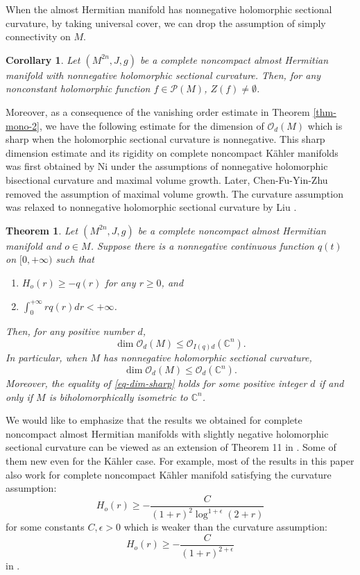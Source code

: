 \documentclass[12pt]{amsart}
\def\e{\epsilon}
\newcommand\C{{\mathbb C}}
\newtheorem{thm}{Theorem}[section]
\newtheorem{cor}{Corollary}[section]
\theoremstyle{definition}
\theoremstyle{remark}
\numberwithin{equation}{section}
\def\D{\displaystyle}
\begin{document}
When the almost Hermitian manifold has nonnegative holomorphic sectional curvature, by taking universal cover, we can drop the assumption of simply connectivity on $M$.
\begin{cor}\label{cor-fund-holo}
Let $(M^{2n},J,g)$ be a complete noncompact almost Hermitian manifold with nonnegative holomorphic sectional curvature. Then, for any nonconstant holomorphic function $f\in \mathcal P(M)$, $Z(f)\neq\emptyset$.
\end{cor}
Moreover,  as a consequence of the vanishing order estimate in  Theorem \ref{thm-mono-2}, we have the following estimate for the dimension of $\mathcal O_d(M)$ which is sharp when the holomorphic sectional curvature is nonnegative. This sharp dimension estimate and its rigidity on complete noncompact K\"ahler manifolds was first obtained by Ni \cite{Ni} under the assumptions of nonnegative holomorphic bisectional curvature and maximal volume growth. Later, Chen-Fu-Yin-Zhu \cite{CFYZ} removed the assumption of maximal volume growth. The curvature assumption was relaxed to nonnegative holomorphic sectional curvature by Liu \cite{Liu}.
\begin{thm}\label{thm-dim}
Let $(M^{2n},J,g)$ be a complete noncompact almost Hermitian manifold and $o\in M$. Suppose there is a nonnegative continuous function $q(t)$ on $[0,+\infty)$ such that  \begin{enumerate}
\item $H_o(r)\geq -q(r)$ for any $r\geq0$, and
\item $\D\int_0^{+\infty}rq(r)dr<+\infty$.
\end{enumerate}
 Then, for any positive number $d$,
\begin{equation}\label{eq-dim-g}
\dim \mathcal O_d(M)\leq \mathcal O_{I(q)d}(\mathbb C^n).
\end{equation}
In particular, when $M$ has nonnegative holomorphic sectional curvature,
\begin{equation}\label{eq-dim-sharp}
\dim \mathcal O_d(M)\leq \mathcal O_{d}(\mathbb C^n).
\end{equation}
Moreover, the equality of \eqref{eq-dim-sharp} holds for some positive integer $d$ if and only if $M$ is biholomorphically isometric to $\C^n$.
\end{thm}
We would like to emphasize that the results we obtained for complete noncompact almost Hermitian manifolds with slightly negative holomorphic sectional curvature can be viewed as an extension of Theorem 11 in \cite{Liu}. Some of them new even for the K\"ahler case. For example, most of the results in this paper also work for complete noncompact K\"ahler manifold satisfying the curvature assumption: $$H_o(r)\geq-\frac{C}{(1+r)^2\log^{1+\e}(2+r)}$$
for some constants $C,\e>0$ which is weaker than the curvature assumption:
$$H_o(r)\geq -\frac{C}{(1+r)^{2+\e}}$$
in \cite[Theorem 11]{Liu}.
\end{document}
